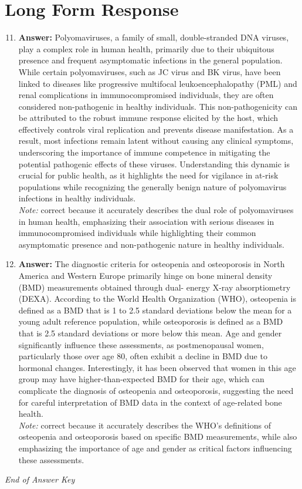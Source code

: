 \documentclass[12pt]{article}
\begin{document}
\section*{Long Form Response}
\begin{enumerate}[label=\arabic*.]
\setcounter{enumi}{10}
\item \textbf{Answer:} Polyomaviruses, a family of small, double-stranded DNA viruses, play a complex role in human health, primarily due to their ubiquitous presence and frequent asymptomatic infections in the general population. While certain polyomaviruses, such as JC virus and BK virus, have been linked to diseases like progressive multifocal leukoencephalopathy (PML) and renal complications in immunocompromised individuals, they are often considered non-pathogenic in healthy individuals. This non-pathogenicity can be attributed to the robust immune response elicited by the host, which effectively controls viral replication and prevents disease manifestation. As a result, most infections remain latent without causing any clinical symptoms, underscoring the importance of immune competence in mitigating the potential pathogenic effects of these viruses. Understanding this dynamic is crucial for public health, as it highlights the need for vigilance in at-risk populations while recognizing the generally benign nature of polyomavirus infections in healthy individuals.
\\ \textit{Note:} correct because it accurately describes the dual role of polyomaviruses in human health, emphasizing their association with serious diseases in immunocompromised individuals while highlighting their common asymptomatic presence and non-pathogenic nature in healthy individuals.
\item \textbf{Answer:} The diagnostic criteria for osteopenia and osteoporosis in North America and Western Europe primarily hinge on bone mineral density (BMD) measurements obtained through dual- energy X-ray absorptiometry (DEXA). According to the World Health Organization (WHO), osteopenia is defined as a BMD that is 1 to 2.5 standard deviations below the mean for a young adult reference population, while osteoporosis is defined as a BMD that is 2.5 standard deviations or more below this mean. Age and gender significantly influence these assessments, as postmenopausal women, particularly those over age 80, often exhibit a decline in BMD due to hormonal changes. Interestingly, it has been observed that women in this age group may have higher-than-expected BMD for their age, which can complicate the diagnosis of osteopenia and osteoporosis, suggesting the need for careful interpretation of BMD data in the context of age-related bone health.
\\ \textit{Note:} correct because it accurately describes the WHO's definitions of osteopenia and osteoporosis based on specific BMD measurements, while also emphasizing the importance of age and gender as critical factors influencing these assessments.
\end{enumerate}

\vfill
\noindent\textit{End of Answer Key}
\end{document}
